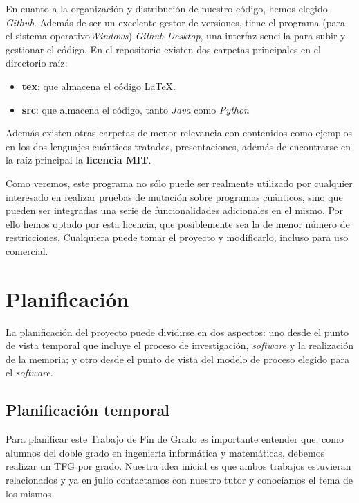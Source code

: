 En cuanto a la organización y distribución de nuestro código, hemos elegido \textit{Github}. Además de ser un excelente gestor de versiones, tiene el programa (para el sistema operativo\textit{Windows}) \textit{Github Desktop}, una interfaz sencilla para subir y gestionar el código. En el repositorio existen dos carpetas principales en el directorio raíz:

\begin{itemize}
\item \textbf{tex}: que almacena el código \LaTeX.
\item \textbf{src}: que almacena el código, tanto \textit{Java} como \textit{Python}
\end{itemize}

Además existen otras carpetas de menor relevancia con contenidos como ejemplos en los dos lenguajes cuánticos tratados, presentaciones, además de encontrarse en la raíz principal la \textbf{licencia MIT}.

Como veremos, este programa no sólo puede ser realmente utilizado por cualquier interesado en realizar pruebas de mutación sobre programas cuánticos, sino que pueden ser integradas una serie de funcionalidades adicionales en el mismo. Por ello hemos optado por esta licencia, que posiblemente sea la de menor número de restricciones. Cualquiera puede tomar el proyecto y modificarlo, incluso para uso comercial.

\section{Planificación}

La planificación del proyecto puede dividirse en dos aspectos: uno desde el punto de vista temporal que incluye el proceso de investigación, \textit{software} y la realización de la memoria; y otro desde el punto de vista del modelo de proceso elegido para el \textit{software}.

\subsection{Planificación temporal}

Para planificar este Trabajo de Fin de Grado es importante entender que, como alumnos del doble grado en ingeniería informática y matemáticas, debemos realizar un TFG por grado. Nuestra idea inicial es que ambos trabajos estuvieran relacionados y ya en julio contactamos con nuestro tutor y conocíamos el tema de los mismos.

